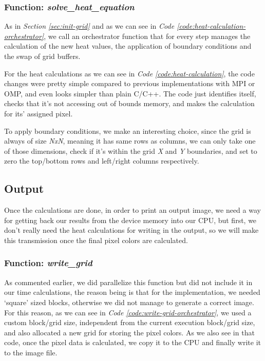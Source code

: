 \documentclass[../main.tex]{subfiles}
\begin{document}
\subsubsection{Function: \textit{solve\_heat\_equation}}

As in \textit{Section \ref{sec:init-grid}} and as we can see in \textit{Code \ref{code:heat-calculation-orchestrator}}, we call an orchestrator function that for every step manages the calculation of the new heat values, the application of boundary conditions and the swap of grid buffers.

For the heat calculations as we can see in \textit{Code \ref{code:heat-calculation}}, the code changes were pretty simple compared to previous implementations with MPI or OMP, and even looks simpler than plain C/C++. The code just identifies itself, checks that it's not accessing out of bounds memory, and makes the calculation for its' assigned pixel.

To apply boundary conditions, we make an interesting choice, since the grid is always of size \textit{NxN}, meaning it has same rows as columns, we can only take one of those dimensions, check if it's within the grid \textit{X} and \textit{Y} boundaries, and set to zero the top/bottom rows and left/right columns respectively.  

\subsection{Output}

Once the calculations are done, in order to print an output image, we need a way for getting back our results from the device memory into our CPU, but first, we don't really need the heat calculations for writing in the output, so we will make this transmission once the final pixel colors are calculated. 

\subsubsection{Function: \textit{write\_grid}}

As commented earlier, we did parallelize this function but did not include it in our time calculations, the reason being is that for the implementation, we needed `square' sized blocks, otherwise we did not manage to generate a correct image. For this reason, as we can see in \textit{Code \ref{code:write-grid-orchestrator}}, we used a custom block/grid size, independent from the current execution block/grid size, and also allocated a new grid for storing the pixel colors. As we also see in that code, once the pixel data is calculated, we copy it to the CPU and finally write it to the image file.
\end{document}
